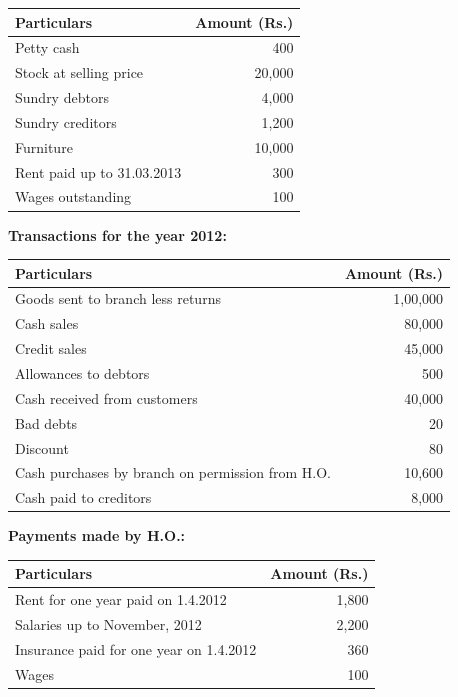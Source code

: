 \documentclass[11pt,a4paper]{article}
\begin{document}
\begin{center}
\renewcommand{\arraystretch}{1.2}

\begin{tabular}{|l|r|}
\hline
   \textbf{Particulars} &   \textbf{Amount (Rs.)} \\ \hline
Petty cash & 400 \\
Stock at selling price & 20,000 \\
Sundry debtors & 4,000 \\
Sundry creditors & 1,200 \\
Furniture & 10,000 \\
Rent paid up to 31.03.2013 & 300 \\
Wages outstanding & 100 \\ \hline
\end{tabular}
\end{center}

   \textbf{Transactions for the year 2012:}

\begin{center}
\renewcommand{\arraystretch}{1.2}

\begin{tabular}{|l|r|}
\hline
   \textbf{Particulars} &   \textbf{Amount (Rs.)} \\ \hline
Goods sent to branch less returns & 1,00,000 \\
Cash sales & 80,000 \\
Credit sales & 45,000 \\
Allowances to debtors & 500 \\
Cash received from customers & 40,000 \\
Bad debts & 20 \\
Discount & 80 \\
Cash purchases by branch on permission from H.O. & 10,600 \\
Cash paid to creditors & 8,000 \\ \hline
\end{tabular}
\end{center}

   \textbf{Payments made by H.O.:}

\begin{center}
\renewcommand{\arraystretch}{1.2}

\begin{tabular}{|l|r|}
\hline
   \textbf{Particulars} &   \textbf{Amount (Rs.)} \\ \hline
Rent for one year paid on 1.4.2012 & 1,800 \\
Salaries up to November, 2012 & 2,200 \\
Insurance paid for one year on 1.4.2012 & 360 \\
Wages & 100 \\ \hline
\end{tabular}
\end{center}
\end{document}

